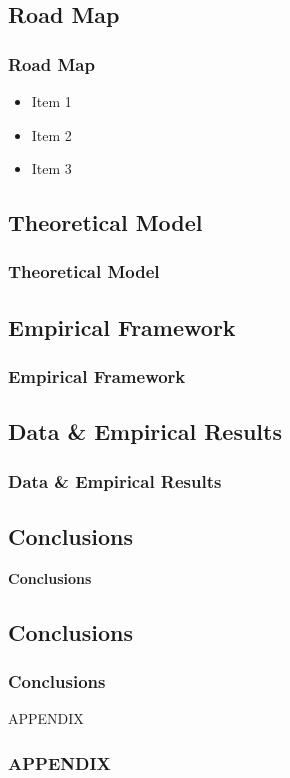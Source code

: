 \documentclass[11pt]{beamer}
\begin{document}
\begin{frame}
	\section{Road Map}
	\frametitle{Road Map}
	
	\begin{itemize}
		\item Item 1
		\item Item 2
		\item Item 3
	\end{itemize}
\end{frame}

\begin{frame}
	\section{Theoretical Model}
	\frametitle{Theoretical Model}
\end{frame}

\begin{frame}
	\section{Empirical Framework}
	\frametitle{Empirical Framework}
\end{frame}

\begin{frame}
	\section{Data \& Empirical Results}
	\frametitle{Data \& Empirical Results}
\end{frame}

\begin{frame}
	\section{Conclusions}
	\begin{center}
	\textbf{{\LARGE Conclusions}}	
	\end{center}

\end{frame}

\begin{frame}
	\section{Conclusions}
	\frametitle{Conclusions}
\end{frame}

\begin{frame}
	
	\begin{center}
		APPENDIX
	\end{center}
	\frametitle{APPENDIX}
\end{frame}
\end{document}
